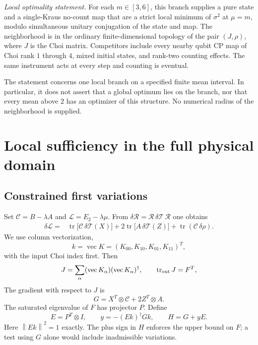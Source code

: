 \documentclass[aps,pra,reprint,amsmath,amssymb,longbibliography]{revtex4-2}
\newcommand{\tr}{\operatorname{tr}}
\newcommand{\vecop}{\operatorname{vec}}
\newcommand{\T}{\mathcal T}
\newcommand{\R}{\mathcal R}
\newcommand{\norm}[1]{\left\lVert#1\right\rVert}
\begin{document}
\textit{Local optimality statement.} For each $m\in[3,6]$, this branch supplies a pure state and a single-Kraus no-count map that are a strict local minimum of $\sigma^2$ at $\mu=m$, modulo simultaneous unitary conjugation of the state and map. The neighborhood is in the ordinary finite-dimensional topology of the pair $(J,\rho)$, where $J$ is the Choi matrix. Competitors include every nearby qubit CP map of Choi rank $1$ through $4$, mixed initial states, and rank-two counting effects. The same instrument acts at every step and counting is eventual.

The statement concerns one local branch on a specified finite mean interval. In particular, it does not assert that a global optimum lies on the branch, nor that every mean above $2$ has an optimizer of this structure. No numerical radius of the neighborhood is supplied.

\section{Local sufficiency in the full physical domain}\label{sec:proof}
\subsection{Constrained first variations}
Set $\mathcal C=B-\lambda A$ and $\mathcal L=E_2-\lambda\mu$. From $\delta\R=\R\,\delta\T\,\R$ one obtains
\begin{align}
 \delta\mathcal L={}&\tr\bigl[\mathcal C\,\delta\T(X)\bigr]
 +2\tr\bigl[A\,\delta\T(Z)\bigr]
 +\tr(\mathcal C\,\delta\rho).\label{eq:variation}
\end{align}
We use column vectorization,
\begin{equation}
 k=\vecop K=(K_{00},K_{10},K_{01},K_{11})^T,
\end{equation}
with the input Choi index first. Then
\begin{equation}
 J=\sum_\alpha (\vecop K_\alpha)(\vecop K_\alpha)^\dagger,
 \qquad \tr_{\rm out}J=F^T,\label{eq:choi}
\end{equation}
The gradient with respect to $J$ is
\begin{equation}
 G=X^T\otimes\mathcal C+2Z^T\otimes A.\label{eq:gradient}
\end{equation}
The saturated eigenvalue of $F$ has projector $P$. Define
\begin{equation}
 E=P^T\otimes I,\qquad y=-(Ek)^\dagger Gk,\qquad H=G+yE.\label{eq:slack}
\end{equation}
Here $\norm{Ek}^2=1$ exactly. The plus sign in $H$ enforces the upper bound on $F$; a test using $G$ alone would include inadmissible variations.
\end{document}
